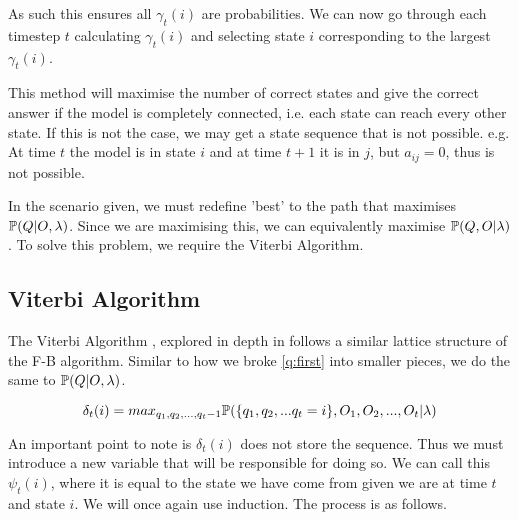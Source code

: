 As such this ensures all $\gamma_t(i)$ are probabilities. We can now go through each timestep $t$ calculating $\gamma_t(i)$ and selecting state $i$ corresponding to the largest $\gamma_t(i)$.


This method will maximise the number of correct states and give the correct answer if the model is completely connected, i.e. each state can reach every other state. If this is not the case, we may get a state sequence that is not possible. e.g. At time $t$ the model is in state $i$ and at time $t+1$ it is in $j$, but $a_{ij} = 0$, thus is not possible.

In the scenario given, we must redefine 'best' to the path that maximises $\mathbb{P} (Q | O, \lambda)$. Since we are maximising this, we can equivalently maximise $\mathbb{P} (Q, O | \lambda)$. To solve this problem, we require the Viterbi Algorithm.


\subsection{Viterbi Algorithm}
The Viterbi Algorithm \cite{viterbi1967error}, explored in depth in \cite{forney1973viterbi} follows a similar lattice structure of the F-B algorithm. Similar to how we broke \ref{q:first} into smaller pieces, we do the same to $\mathbb{P} (Q | O, \lambda)$.

\begin{equation}
    \delta_t(i)  = max_{q_1,q_2,...,q_t-1} \mathbb{P} (\{q_1,q_2,...q_t=i\},{O_1,O_2,...,O_t}|\lambda) 
\end{equation}

An important point to note is $\delta_t(i)$ does not store the sequence. Thus we must introduce a new variable that will be responsible for doing so. We can call this $\psi_t(i)$, where it is equal to the state we have come from given we are at time $t$ and state $i$. We will once again use induction. The process is as follows.

